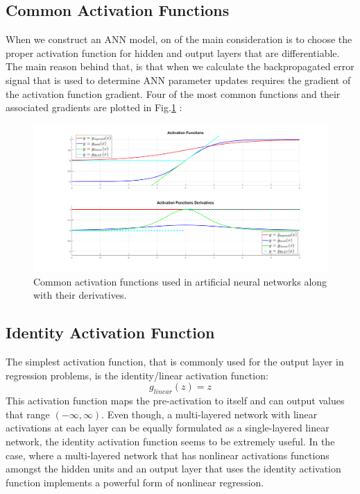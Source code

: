 \subsection{Common Activation Functions}
When we construct an ANN model, on of the main consideration is to choose the proper activation function for hidden and output layers that are differentiable. The main reason behind that, is that when we calculate the backpropagated error signal that is used to determine ANN parameter updates requires the gradient of the activation function gradient. Four of the most common functions and their associated gradients are plotted in Fig.\ref{fig:activation_functions} :
\begin{figure}[h!]
\includegraphics[width=20cm,center,keepaspectratio]{figures/activation_functions}
\caption{Common activation functions used in artificial neural networks along with their derivatives.}
\label{fig:activation_functions}
\end{figure}
\subsection{Identity Activation Function}
The simplest activation function, that is commonly used for the output layer in regression problems, is the identity/linear activation function:
\begin{equation*}
g_{linear}(z) = z
\end{equation*}
This activation function maps the pre-activation to itself and can output values that range $(-\infty,\infty)$. Even though, a multi-layered network with linear activations at each layer can be equally formulated as a single-layered linear network, the identity activation function seems to be extremely useful. In the case, where a multi-layered network that has nonlinear activations functions amongst the hidden units and an output layer  that uses the identity activation function implements a powerful form of nonlinear regression. \cite{Goodfellow-et-al-2016}
